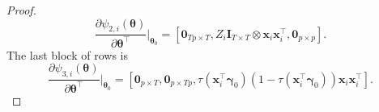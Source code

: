\documentclass[10pt,a4paper]{amsart}
\newcommand{\IdenMat}{\textbf{I}}
\newcommand{\LogCoe}{\boldsymbol{\gamma}}
\newcommand{\ObsCov}{\textbf{x}_i}
\begin{document}
\begin{proof}
\begin{equation*}
                \frac{\partial \psi_{2,i}(\boldsymbol{\theta})}{ \partial \boldsymbol{\theta}^{\top} } \biggr\rvert_{\boldsymbol{\theta}_0} 
                = \left[ \textbf{0}_{Tp \times T},  Z_i \IdenMat_{T \times T} \otimes \textbf{x}_i\textbf{x}_i^{\top} , \textbf{0}_{p \times p} \right].
            \end{equation*}
        The last block of rows is
            \begin{equation*}
                \frac{\partial \psi_{3,i}(\boldsymbol{\theta})}{ \partial \boldsymbol{\theta}^{\top} } \biggr\rvert_{\boldsymbol{\theta}_0} 
                = \left[ \textbf{0}_{p \times T}, \textbf{0}_{p \times Tp}, \tau(\ObsCov^{\top} \LogCoe_0)(1-\tau(\ObsCov^{\top} \LogCoe_0)) \ObsCov\ObsCov^{\top}  \right].
            \end{equation*}
        

\end{proof}
\end{document}
